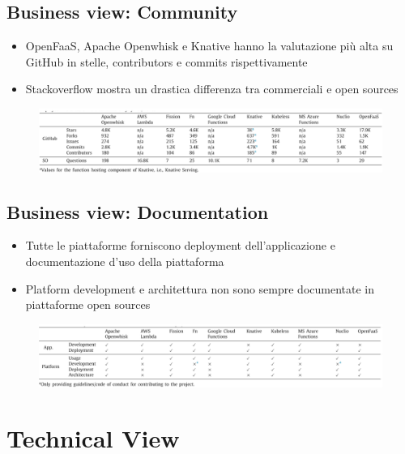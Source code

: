 \documentclass[a4paper, 12pt]{report}
\begin{document}
            \subsection{Business view: Community}
            \begin{itemize}
              \item OpenFaaS, Apache Openwhisk e Knative hanno la valutazione più alta su GitHub in stelle, contributors e commits rispettivamente
              \item Stackoverflow mostra un drastica differenza tra commerciali e open sources
            \end{itemize}
            \begin{figure}[h]
              \centering
              \includegraphics[scale=0.3]{Immagini/Community.png}
            \end{figure}
            \subsection{Business view: Documentation}
            \begin{itemize}
              \item Tutte le piattaforme forniscono deployment dell'applicazione e documentazione d'uso della piattaforma 
              \item Platform development e architettura non sono sempre documentate in piattaforme open sources
            \end{itemize}
            \begin{figure}[h]
              \centering
              \includegraphics[scale=0.3]{Immagini/Documentation.png}
            \end{figure}
            \clearpage
            \section{Technical View}
\end{document}
